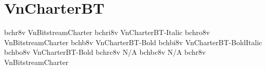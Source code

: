 \documentclass[sample]{vnsample}
\begin{document}
\section{VnCharterBT}
  {bchr8v}   {VnBitstreamCharter}
 {bchri8v}  {VnCharterBT-Italic}
 {bchro8v}  {VnBitstreamCharter}
  {bchb8v}   {VnCharterBT-Bold}
 {bchbi8v}  {VnCharterBT-BoldItalic}
 {bchbo8v}  {VnCharterBT-Bold}
 {bchrc8v}  {N/A}
 {bchbc8v}  {N/A}
  {bchr8v}   {VnBitstreamCharter}
\end{document}
